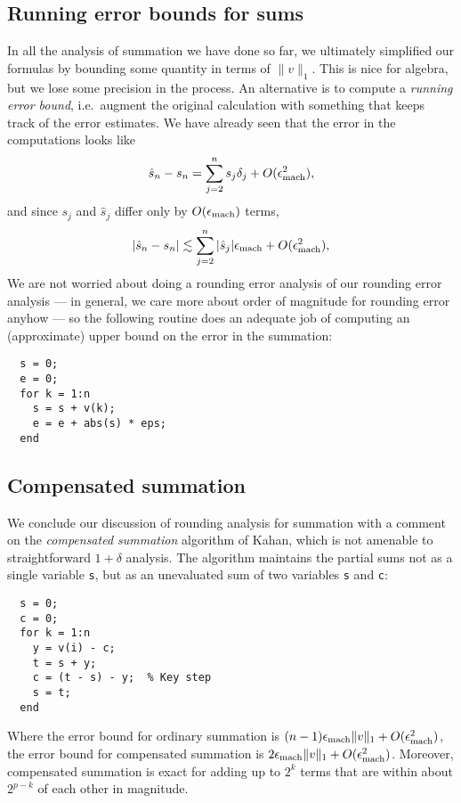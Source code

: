 \documentclass[12pt, leqno]{article} %
\begin{document}
\subsection{Running error bounds for sums}

In all the analysis of summation we have done so far, we ultimately
simplified our formulas by bounding some quantity in terms of $\|v\|_1$.
This is nice for algebra, but we lose some precision in the process.
An alternative is to compute a {\em running error bound}, i.e.~augment
the original calculation with something that keeps track of the error
estimates.  We have already seen that the error in the computations
looks like
\[
  \hat{s}_n-s_n = \sum_{j=2}^n s_j \delta_j + O(\epsilon_{\mathrm{mach}}^2),
\]
and since $s_j$ and $\hat{s}_j$ differ only by $O(\epsilon_{\mathrm{mach}})$ terms,
\[
  |\hat{s}_n-s_n| \lesssim \sum_{j=2}^n |\hat{s}_j| \epsilon_{\mathrm{mach}} + O(\epsilon_{\mathrm{mach}}^2),
\]
We are not worried about doing a rounding error analysis of our rounding
error analysis --- in general, we care more about order of magnitude for
rounding error anyhow --- so the following routine does an adequate job
of computing an (approximate) upper bound on the error in the summation:
\begin{lstlisting}
  s = 0;
  e = 0;
  for k = 1:n
    s = s + v(k);
    e = e + abs(s) * eps;
  end
\end{lstlisting}

\subsection{Compensated summation}

We conclude our discussion of rounding analysis for summation
with a comment on the {\em compensated summation} algorithm of
Kahan, which is not amenable to straightforward $1+\delta$ analysis.
The algorithm maintains the partial sums not as a single variable
{\tt s}, but as an unevaluated sum of two
variables {\tt s} and {\tt c}:
\begin{lstlisting}
  s = 0;
  c = 0;
  for k = 1:n
    y = v(i) - c;
    t = s + y;
    c = (t - s) - y;  % Key step
    s = t;
  end
\end{lstlisting}
Where the error bound for ordinary summation is
$(n-1) \epsilon_{\mathrm{mach}} \|v\|_1 + O(\epsilon_{\mathrm{mach}}^2)$,
the error bound for compensated summation is
$2 \epsilon_{\mathrm{mach}} \|v\|_1 + O(\epsilon_{\mathrm{mach}}^2)$.  Moreover,
compensated summation is exact for adding up to $2^k$
terms that are within about $2^{p-k}$ of each other
in magnitude.
\end{document}
